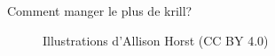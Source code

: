 \documentclass[
  ignorenonframetext,
]{beamer}
\begin{document}
\begin{frame}{Comment manger le plus de krill?}
\protect\hypertarget{comment-manger-le-plus-de-krill}{}
\begin{figure}

\begin{minipage}[t]{0.50\linewidth}

{\centering 


}

\end{minipage}%
%
\begin{minipage}[t]{0.50\linewidth}

{\centering 


}

\end{minipage}%

\caption{\label{fig-krill}Illustrations d'Allison Horst (CC BY 4.0)}

\end{figure}
\end{frame}
\end{document}
